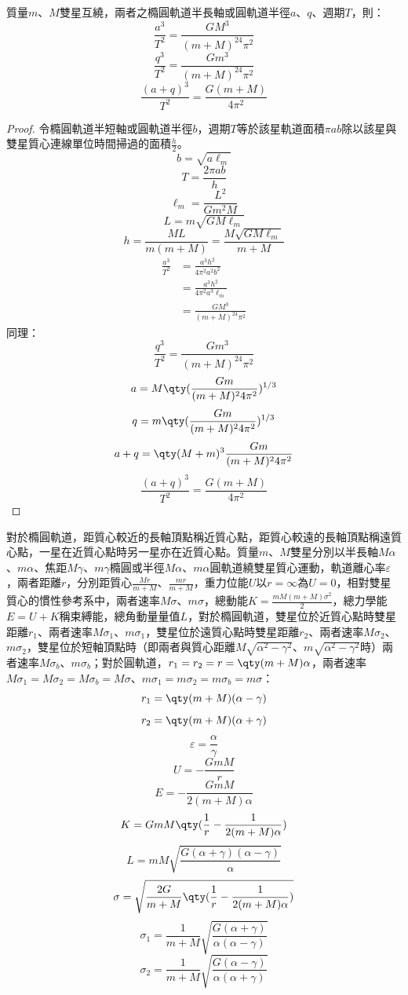 \documentclass[a4paper,12pt]{article}
\begin{document}
質量$m$、$M$雙星互繞，兩者之橢圓軌道半長軸或圓軌道半徑$a$、$q$、週期$T$，則：
\[\frac{a^3}{T^2}=\frac{GM^3}{(m+M)^24\pi^2}\]
\[\frac{q^3}{T^2}=\frac{Gm^3}{(m+M)^24\pi^2}\]
\[\frac{(a+q)^3}{T^2}=\frac{G(m+M)}{4\pi^2}\]
\begin{proof}
令橢圓軌道半短軸或圓軌道半徑$b$，週期$T$等於該星軌道面積$\pi ab$除以該星與雙星質心連線單位時間掃過的面積$\frac{h}{2}$。
\[b=\sqrt{a\ell_m}\]
\[T=\frac{2\pi ab}{h}\]
\[\ell_m=\frac{L^2}{Gm^2M}\]
\[L=m\sqrt{GM\ell_m}\]
\[h=\frac{ML}{m(m+M)}=\frac{M\sqrt{GM\ell_m}}{m+M}\]
\[\begin{aligned}
\frac{a^3}{T^2}&=\frac{a^3h^2}{4\pi^2 a^2b^2}\\
&=\frac{a^3h^2}{4\pi^2a^3\ell_m}\\
&=\frac{GM^3}{(m+M)^24\pi^2}
\end{aligned}\]
同理：
\[\frac{q^3}{T^2}=\frac{Gm^3}{(m+M)^24\pi^2}\]
\[a=M\qty(\frac{Gm}{(m+M)^24\pi^2})^{1/3}\]
\[q=m\qty(\frac{Gm}{(m+M)^24\pi^2})^{1/3}\]
\[a+q=\qty(M+m)^3\frac{Gm}{(m+M)^24\pi^2}\]
\[\frac{(a+q)^3}{T^2}=\frac{G(m+M)}{4\pi^2}\]
\end{proof}
對於橢圓軌道，距質心較近的長軸頂點稱近質心點，距質心較遠的長軸頂點稱遠質心點，一星在近質心點時另一星亦在近質心點。質量$m$、$M$雙星分別以半長軸$M\alpha$、$m\alpha$、焦距$M\gamma$、$m\gamma$橢圓或半徑$M\alpha$、$m\alpha$圓軌道繞雙星質心運動，軌道離心率$\varepsilon$，兩者距離$r$，分別距質心$\frac{Mr}{m+M}$、$\frac{mr}{m+M}$，重力位能$U$以$r=\infty$為$U=0$，相對雙星質心的慣性參考系中，兩者速率$M\sigma$、$m\sigma$，總動能$K=\frac{mM(m+M)\sigma^2}{2}$，總力學能$E=U+K$稱束縛能，總角動量量值$L$，對於橢圓軌道，雙星位於近質心點時雙星距離$r_1$、兩者速率$M\sigma_1$、$m\sigma_1$，雙星位於遠質心點時雙星距離$r_2$、兩者速率$M\sigma_2$、$m\sigma_2$，雙星位於短軸頂點時（即兩者與質心距離$M\sqrt{\alpha^2-\gamma^2}$、$m\sqrt{\alpha^2-\gamma^2}$時）兩者速率$M\sigma_b$、$m\sigma_b$；對於圓軌道，$r_1=r_2=r=\qty(m+M)\alpha$，兩者速率$M\sigma_1=M\sigma_2=M\sigma_b=M\sigma$、$m\sigma_1=m\sigma_2=m\sigma_b=m\sigma$：
\[r_1=\qty(m+M)(\alpha-\gamma)\]
\[r_2=\qty(m+M)(\alpha+\gamma)\]
\[\varepsilon=\frac{\alpha}{\gamma}\]
\[U=-\frac{GmM}{r}\]
\[E=-\frac{GmM}{2(m+M)\alpha}\]
\[K=GmM\qty(\frac{1}{r}-\frac{1}{2(m+M)\alpha})\]
\[L=mM\sqrt{\frac{G(\alpha+\gamma)(\alpha-\gamma)}{\alpha}}\]
\[\sigma=\sqrt{\frac{2G}{m+M}\qty(\frac{1}{r}-\frac{1}{2(m+M)\alpha})}\]
\[\sigma_1=\frac{1}{m+M}\sqrt{\frac{G(\alpha+\gamma)}{\alpha(\alpha-\gamma)}}\]
\[\sigma_2=\frac{1}{m+M}\sqrt{\frac{G(\alpha-\gamma)}{\alpha(\alpha+\gamma)}}\]
\end{document}
